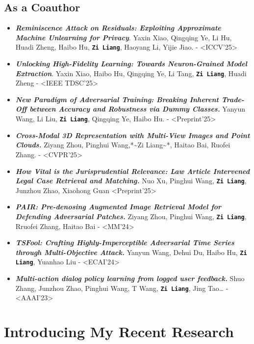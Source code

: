 \documentclass[11pt]{article}
\begin{document}
\subsection{As a Coauthor}
\label{sec:org8990de0}
\begin{itemize}
\item \emph{\textbf{Reminiscence Attack on Residuals: Exploiting Approximate Machine Unlearning for Privacy}}. Yaxin Xiao, Qingqing Ye, Li Hu, Huadi Zheng, Haibo Hu, \textbf{\texttt{Zi Liang}}, Haoyang Li, Yijie Jiao. - <ICCV'25>
\item \emph{\textbf{Unlocking High-Fidelity Learning: Towards Neuron-Grained Model Extraction}}. Yaxin Xiao, Haibo Hu, Qingqing Ye, Li Tang, \textbf{\texttt{Zi Liang}}, Huadi Zheng - <IEEE TDSC'25>
\item \emph{\textbf{New Paradigm of Adversarial Training: Breaking Inherent Trade-Off between Accuracy and Robustness via Dummy Classes.}} Yanyun Wang, Li Liu, \textbf{\texttt{Zi Liang}}, Qingqing Ye, Haibo Hu. - <Preprint'25>
\item \emph{\textbf{Cross-Modal 3D Representation with Multi-View Images and Point Clouds.}} Ziyang Zhou, Pinghui Wang,*\textasciitilde{}Zi Liang\textasciitilde{}*, Haitao Bai, Ruofei Zhang. - <CVPR'25>
\item \emph{\textbf{How Vital is the Jurisprudential Relevance: Law Article Intervened Legal Case Retrieval and Matching.}} Nuo Xu, Pinghui Wang, \textbf{\texttt{Zi Liang}}, Junzhou Zhao, Xiaohong Guan <Preprint'25>
\item \emph{\textbf{PAIR: Pre-denosing Augmented Image Retrieval Model for Defending Adversarial Patches.}} Ziyang Zhou, Pinghui Wang, \textbf{\texttt{Zi Liang}}, Rruofei Zhang, Haitao Bai - <MM'24>
\item \emph{\textbf{TSFool: Crafting Highly-Imperceptible Adversarial Time Series through Multi-Objective Attack.}} Yanyun Wang, Dehui Du, Haibo Hu,  \textbf{\texttt{Zi Liang}}, Yuanhao Liu - <ECAI'24>
\item \emph{\textbf{Multi-action dialog policy learning from logged user feedback.}} Shuo Zhang, Junzhou Zhao, Pinghui Wang, T Wang,  \textbf{\texttt{Zi Liang}}, Jing Tao… - <AAAI'23>
\end{itemize}
\section{Introducing My Recent Research}
\label{sec:org04b5e21}
\end{document}
